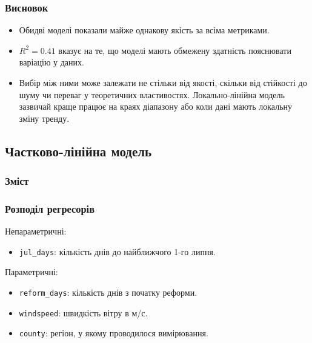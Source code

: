 \documentclass{beamer}
\begin{document}
\begin{frame}
  \frametitle{Висновок}
  \begin{itemize}
    \item Обидві моделі показали майже однакову якість за всіма метриками. 
    \item $ R^2 = 0.41 $ вказує на те, що моделі мають обмежену здатність пояснювати варіацію у даних.
    \item Вибір між ними може залежати не стільки від якості, скільки від стійкості до шуму чи переваг у теоретичних властивостях.
    Локально-лінійна модель зазвичай краще працює на краях діапазону або коли дані мають локальну зміну тренду.
  \end{itemize}
\end{frame}


\begin{frame}
  \section{Частково-лінійна модель}

  \frametitle{Зміст}
  \tableofcontents[currentsection]
\end{frame}

\begin{frame}
  \frametitle{Розподіл регресорів}
  
  Непараметричні:
  
  \begin{itemize}
    \item \texttt{jul\_days}: кількість днів до найближчого 1-го липня.
  \end{itemize}
  
  Параметричні:
  \begin{itemize}
    \item \texttt{reform\_days}: кількість днів з початку реформи.
    \item \texttt{windspeed}: швидкість вітру в м/с.
    \item \texttt{county}\footnotemark: регіон, у якому проводилося вимірювання.
  \end{itemize}
  

\end{frame}
\end{document}
